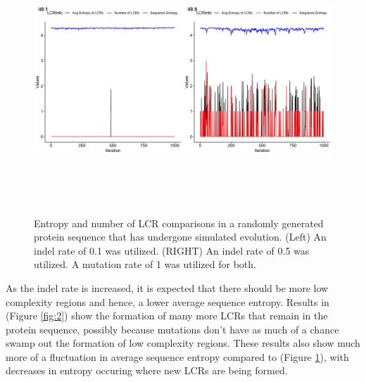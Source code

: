 \documentclass{article}
\providecommand{\figref}[1]{(Figure \ref{#1})}  %
\begin{document}
\begin{figure}[H]
	\includegraphics[width=18cm, height=10cm]{im0.01-0.1-0.5.jpeg}
	\caption{Entropy and number of LCR comparisons in a randomly generated protein sequence that has undergone simulated evolution. (Left) An indel rate of 0.1 was utilized. (RIGHT) An indel rate of 0.5 was utilized. A mutation rate of 1 was utilized for both.}
	\label{fig:1}
\end{figure}

As the indel rate is increased, it is expected that there should be more low complexity regions and hence, a lower average sequence entropy. Results in \figref{fig:2} show the formation of many more LCRs that remain in the protein sequence, possibly because mutations don't have as much of a chance swamp out the formation of low complexity regions. These results also show much more of a fluctuation in average sequence entropy compared to \figref{fig:1}, with decreases in entropy occuring where new LCRs are being formed.
\end{document}

